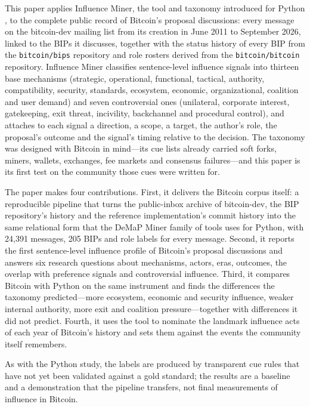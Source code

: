 This paper applies Influence Miner, the tool and taxonomy introduced for Python \cite{influenceMinerPython}, to the complete public record of Bitcoin's proposal discussions: every message on the bitcoin-dev mailing list from its creation in June 2011 to September 2026, linked to the BIPs it discusses, together with the status history of every BIP from the \texttt{bitcoin/bips} repository and role rosters derived from the \texttt{bitcoin/bitcoin} repository. Influence Miner classifies sentence-level influence signals into thirteen base mechanisms (strategic, operational, functional, tactical, authority, compatibility, security, standards, ecosystem, economic, organizational, coalition and user demand) and seven controversial ones (unilateral, corporate interest, gatekeeping, exit threat, incivility, backchannel and procedural control), and attaches to each signal a direction, a scope, a target, the author's role, the proposal's outcome and the signal's timing relative to the decision. The taxonomy was designed with Bitcoin in mind---its cue lists already carried soft forks, miners, wallets, exchanges, fee markets and consensus failures---and this paper is its first test on the community those cues were written for.

The paper makes four contributions. First, it delivers the Bitcoin corpus itself: a reproducible pipeline that turns the public-inbox archive of bitcoin-dev, the BIP repository's history and the reference implementation's commit history into the same relational form that the DeMaP Miner family of tools uses for Python, with 24,391 messages, 205 BIPs and role labels for every message. Second, it reports the first sentence-level influence profile of Bitcoin's proposal discussions and answers six research questions about mechanisms, actors, eras, outcomes, the overlap with preference signals and controversial influence. Third, it compares Bitcoin with Python on the same instrument and finds the differences the taxonomy predicted---more ecosystem, economic and security influence, weaker internal authority, more exit and coalition pressure---together with differences it did not predict. Fourth, it uses the tool to nominate the landmark influence acts of each year of Bitcoin's history and sets them against the events the community itself remembers.

As with the Python study, the labels are produced by transparent cue rules that have not yet been validated against a gold standard; the results are a baseline and a demonstration that the pipeline transfers, not final measurements of influence in Bitcoin.

